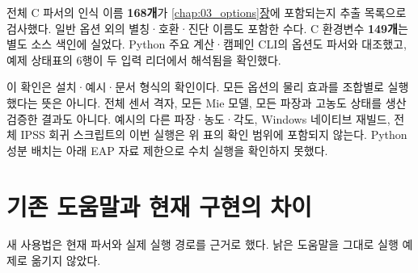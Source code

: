 전체 C 파서의 인식 이름 \textbf{168개}가 \hyperref[chap:03_options]{\ref*{chap:03_options}장}에 포함되는지 추출 목록으로 검사했다. 일반 옵션 외의 별칭·호환·진단 이름도 포함한 수다. C 환경변수 \textbf{149개}는 별도 소스 색인에 실었다. Python 주요 계산·캠페인 CLI의 옵션도 파서와 대조했고, 예제 상태표의 6행이 두 입력 리더에서 해석됨을 확인했다.

이 확인은 설치·예시·문서 형식의 확인이다. 모든 옵션의 물리 효과를 조합별로 실행했다는 뜻은 아니다. 전체 센서 격자, 모든 Mie 모델, 모든 파장과 고농도 상태를 생산 검증한 결과도 아니다. 예시의 다른 파장·농도·각도, Windows 네이티브 재빌드, 전체 IPSS 회귀 스크립트의 이번 실행은 위 표의 확인 범위에 포함되지 않는다. Python 성분 배치는 아래 EAP 자료 제한으로 수치 실행을 확인하지 못했다.

\section{기존 도움말과 현재 구현의 차이}
\label{sec:auto:07_validation_notes:2}
새 사용법은 현재 파서와 실제 실행 경로를 근거로 했다. 낡은 도움말을 그대로 실행 예제로 옮기지 않았다.


